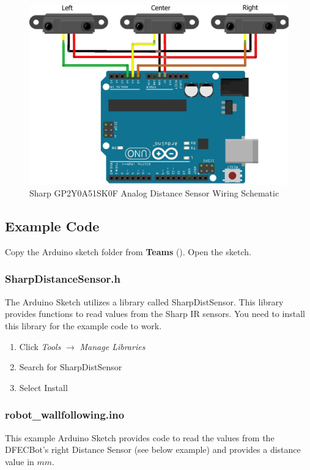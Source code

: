 \documentclass{handout}
\begin{document}
	\begin{figure} [H]
		\centering
		\includegraphics[width=.75\textwidth]{ir.jpg}
		\caption{Sharp GP2Y0A51SK0F Analog Distance Sensor Wiring Schematic}
		\label{Fig IR}
	\end{figure}

	\newpage
\clearpage
\pagebreak

	
	\subsection{Example Code}
	Copy the Arduino sketch folder   from \textbf{Teams} (). Open the  sketch.
	
	\subsubsection{SharpDistanceSensor.h}
	The Arduino Sketch utilizes a library called SharpDistSensor. This library provides functions to read values from the Sharp IR sensors. You need to install this library for the example code to work.
	\begin{enumerate}
		\item Click \textit{Tools} $\rightarrow$ \textit{Manage Libraries}
		\item Search for SharpDistSensor
		\item Select Install
	\end{enumerate}
	
	\subsubsection{robot\_wallfollowing.ino}
	This example Arduino Sketch provides code to read the values from the DFECBot's right Distance Sensor (see below example) and provides a distance value in $mm$.
	
\end{document}
